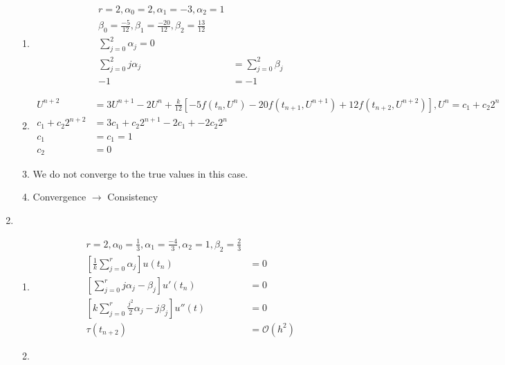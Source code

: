 \documentclass{article}
\begin{document}
\begin{enumerate}
\begin{enumerate}
	\item
		\begin{equation*}
		\begin{split}
		r=2, \alpha_{0} = 2, \alpha_{1} = -3, \alpha_{2} = 1 \\
		\beta_{0} = \frac{-5}{12}, \beta_{1} = \frac{-20}{12}, \beta_{2} = \frac{13}{12} \\
		\sum_{j=0}^{2}\alpha_{j} = 0\\
		\sum_{j=0}^{2} j \alpha_{j} & = \sum_{j=0}^{2} \beta_{j}\\
		-1 & = -1
		\end{split}
		\end{equation*}
	\item
		\begin{equation*}
		\begin{split}
		U^{n+2} &= 3U^{n+1} - 2 U^{n} + \frac{k}{12}[-5f(t_{n}, U^{n}) -20f(t_{n+1}, U^{n+1}) + 12f(t_{n+2}, U^{n+2})], U^{n} = c_{1} + c_{2}2^{n} \\
		c_{1} + c_{2}2^{n+2} & = 3c_{1} + c_{2}2^{n+1} - 2c_{1} + -2c_{2}2^{n}  \\
		c_{1} & = c_{1} = 1  \\
		c_{2} & = 0
		\end{split}
		\end{equation*}
	\item
	We do not converge to the true values in this case. 
	\item
	Convergence $\rightarrow$ Consistency
	\end{enumerate}
\item
	\begin{enumerate}
	\item
		\begin{equation*}
		\begin{split}
		r=2, \alpha_{0} = \frac{1}{3}, \alpha_{1} = \frac{-4}{3}, \alpha_{2} = 1 , \beta_{2} = \frac{2}{3} \\
		[\frac{1}{k} \sum_{j=0}^{r} \alpha_{j}] u(t_{n}) & = 0 \\
		[\sum_{j=0}^{r} j\alpha_{j} - \beta_{j}] u'(t_{n}) & = 0 \\
		[k \sum_{j=0}^{r} \frac{j^{2}}{2} \alpha_{j} - j \beta_{j}] u''(t) & =  0 \\
		\tau(t_{n+2}) & = \mathcal{O}(h^{2}) 
		\end{split}
		\end{equation*}
\item
		\begin{equation*}
		\begin{split}

\end{split}
\end{equation*}
\end{enumerate}
\end{enumerate}
\end{document}
